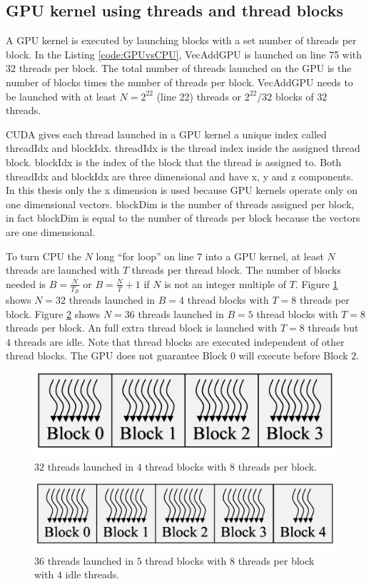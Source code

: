 \subsection{GPU kernel using threads and thread blocks}
A GPU kernel is executed by launching blocks with a set number of threads per block.
In the Listing \ref{code:GPUvsCPU}, VecAddGPU is launched on line 75 with $32$ threads per block.
The total number of threads launched on the GPU is the number of blocks times the number of threads per block.
VecAddGPU needs to be launched with at least $N = 2^{22}$ (line 22) threads or $2^{22}/32$ blocks of $32$ threads.

CUDA gives each thread launched in a GPU kernel a unique index called threadIdx and blockIdx.
threadIdx is the thread index inside the assigned thread block.
blockIdx is the index of the block that the thread is assigned to.
Both threadIdx and blockIdx are three dimensional and have x, y and z components.
In this thesis only the x dimension is used because GPU kernels operate only on one dimensional vectors.
blockDim is the number of threads assigned per block, in fact blockDim is equal to the number of threads per block because the vectors are one dimensional.

To turn CPU the $N$ long ``for loop'' on line 7 into a GPU kernel, at least $N$ threads are launched with $T$ threads per thread block.
The number of blocks needed is $B = \frac{N}{T_B}$ or $B = \frac{N}{T}+1$ if $N$ is not an integer multiple of $T$.
Figure \ref{fig:threadsBlocks32} shows $N = 32$ threads launched in $B = 4$ thread blocks with $T = 8$ threads per block.
Figure \ref{fig:threadsBlocks36} shows $N = 36$ threads launched in $B = 5$ thread blocks with $T = 8$ threads per block. 
An full extra thread block is launched with $T = 8$ threads but $4$ threads are idle.
Note that thread blocks are executed independent of other thread blocks.
The GPU does not guarantee Block $0$ will execute before Block $2$.
\begin{figure}
	\centering\includegraphics[width=4in/100*55]{figures/gpu_intro/threadsBlocks32.pdf}
	\caption{$32$ threads launched in $4$ thread blocks with $8$ threads per block.}
	\label{fig:threadsBlocks32}
\end{figure}
\begin{figure}
	\centering\includegraphics[width=5in/100*55]{figures/gpu_intro/threadsBlocks36.pdf}
	\caption{$36$ threads launched in $5$ thread blocks with $8$ threads per block with $4$ idle threads.}
	\label{fig:threadsBlocks36}
\end{figure}

